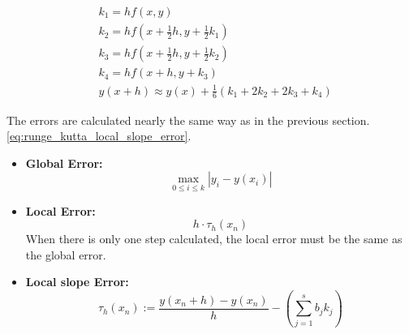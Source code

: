 \begin{equation}\label{eq:runge_kutta_k}
\begin{aligned}
& k_1=h f(x, y) \\
& k_2=h f\left(x+\frac{1}{2} h, y+\frac{1}{2} k_1\right) \\
& k_3=h f\left(x+\frac{1}{2} h, y+\frac{1}{2} k_2\right) \\
& k_4=h f\left(x+h, y+k_3\right) \\
& y(x+h) \approx y(x)+\frac{1}{6}\left(k_1+2 k_2+2 k_3+k_4\right)
\end{aligned}
\end{equation}


The errors are calculated nearly the same way as in the previous section. \autoref{eq:runge_kutta_local_slope_error}.

\begin{itemize}
    \item \textbf{Global Error:} 
    \begin{equation}\label{eq:runge_kutta_global_error_explicit_method}
    \max _{0 \leq i \leq k}\left|y_i-y\left(x_i\right)\right|
    \end{equation}
    \item \textbf{Local Error:}
    \begin{equation}\label{eq:runge_kutta_local_error_explicit_method}
    h \cdot \tau_h\left(x_n\right)
    \end{equation}
    When there is only one step calculated, the local error must be the same as the global error.
    \item \textbf{Local slope Error:}
    \begin{equation}\label{eq:runge_kutta_local_slope_error}
    \tau_h\left(x_n\right):=\frac{y\left(x_n+h\right)-y\left(x_n\right)}{h}-\left(\sum_{j=1}^s b_j k_j\right)
    \end{equation}
\end{itemize}
